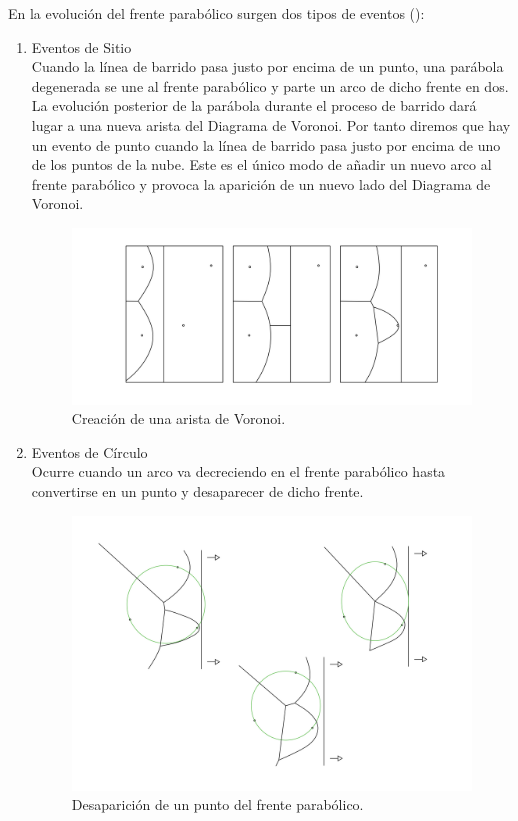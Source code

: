 En la evolución del frente parabólico surgen dos tipos de eventos (\cite{fotosfortune}):
\begin{enumerate}
    \item Eventos de Sitio \\
        Cuando la línea de barrido pasa justo por encima de un punto, una parábola degenerada se une al frente parabólico y parte un arco de dicho frente en dos. La evolución posterior de la parábola durante el proceso de barrido dará lugar a una nueva arista del Diagrama de Voronoi.
        Por tanto diremos que hay un evento de punto cuando la línea de barrido pasa justo por encima de uno de los puntos de la nube. Este es el único modo de añadir un nuevo arco al frente parabólico y provoca la aparición de un nuevo lado del Diagrama de Voronoi.
        
        \begin{figure}  [H]
            \centering
            \includegraphics[scale=0.7]{imagenes/eventopuntos.jpg}
            \caption{Creación de una arista de Voronoi.}
        \end{figure}
        
    \item Eventos de Círculo \\
        Ocurre cuando un arco va decreciendo en el frente parabólico hasta convertirse en un punto y desaparecer de dicho frente.
        
        \begin{figure}  [H]
            \centering
            \includegraphics[scale=0.7]{imagenes/eventocirculos.jpg}
            \caption{Desaparición de un punto del frente parabólico.}
        \end{figure}
\end{enumerate}

